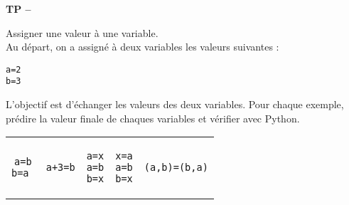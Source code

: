 






\begin{center}
{\Large\bf TP \no {\num} -- \descrip}
\end{center}




\begin{exercice}Assigner une valeur \` a une variable.\\
Au départ, on a assigné à deux variables les valeurs suivantes :
\begin{verbatim}
a=2
b=3
\end{verbatim}
L'objectif est d'échanger les valeurs des deux variables. Pour chaque exemple, pr\' edire la valeur finale de chaques variables et v\' erifier avec Python.
\begin{center}
\begin{tabular}{c|c|c|c|c}
\begin{minipage}{2.5cm}
\begin{verbatim}
a=b
b=a 
\end{verbatim}
\end{minipage}
&
\begin{minipage}{2.5cm}
\begin{verbatim}
a+3=b
\end{verbatim}
\end{minipage}
&
\begin{minipage}{2.5cm}
\begin{verbatim}
a=x
a=b
b=x
\end{verbatim}
\end{minipage}
&
\begin{minipage}{2.5cm}
\begin{verbatim}
x=a
a=b
b=x
\end{verbatim}
\end{minipage}
&
\begin{minipage}{2.5cm}
\begin{verbatim}
(a,b)=(b,a)
\end{verbatim}
\end{minipage}
\end{tabular}
\end{center}
\end{exercice}
\bigskip
 


